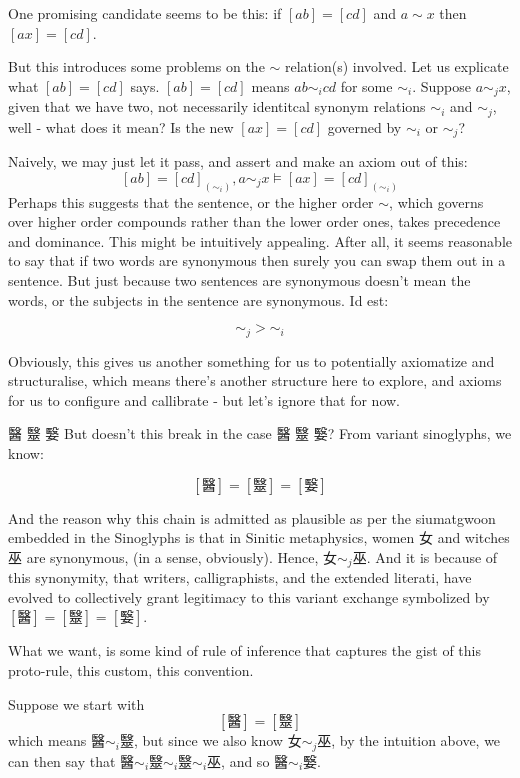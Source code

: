 One promising candidate seems to be this: if $[ab]=[cd]$ and $a\sim x$ then $[ax] = [cd]$.

But this introduces some problems on the $\sim$ relation(s) involved. Let us explicate what $[ab] = [cd]$ says. $[ab] = [cd]$ means $ab \sim_i cd$ for some $\sim_i$. Suppose $a \sim_j x$, given that we have two, not necessarily identitcal synonym relations $\sim_i$ and $\sim_j$, well - what does it mean? Is the new $[ax]=[cd]$ governed by $\sim_i$ or $\sim_j$?

Naively, we may just let it pass, and assert and make an axiom out of this: 
$$ [ab] = [cd]_{(\sim_i)}, a\sim_j x \models [ax] = [cd] _{(\sim_i)} $$ 
Perhaps this suggests that the sentence, or the higher order $\sim$, which governs over higher order compounds rather than the lower order ones, takes precedence and dominance. This might be intuitively appealing. After all, it seems reasonable to say that if two words are synonymous then surely you can swap them out in a sentence. But just because two sentences are synonymous doesn't mean the words, or the subjects in the sentence are synonymous. Id est: 

$$\sim_j > \sim_i$$ 

Obviously, this gives us another something for us to potentially axiomatize and structuralise, which means there's another structure here to explore, and axioms for us to configure and callibrate - but let's ignore that for now. 








醫 毉 嫛
But doesn't this break in the case 醫 毉 嫛? From variant sinoglyphs, we know:

$$[\text{醫}]=[\text{毉}]=[\text{嫛}] $$

And the reason why this chain is admitted as plausible as per the siumatgwoon embedded in the Sinoglyphs is that in Sinitic metaphysics, women 女 and witches 巫 are synonymous, (in a sense, obviously). Hence, $\text{女}\sim_j\text{巫}$. And it is because of this synonymity, that writers, calligraphists, and the extended literati, have evolved to collectively grant legitimacy to this variant exchange symbolized by $[\text{醫}]=[\text{毉}]=[\text{嫛}]$.

What we want, is some kind of rule of inference that captures the gist of this proto-rule, this custom, this convention. 

Suppose we start with $$[\text{醫}]=[\text{毉}]$$
which means $\text{醫}\sim_i\text{毉}$, but since we also know $\text{女}\sim_j\text{巫}$, by the intuition above, we can then say that $\text{醫}\sim_i\text{毉} \sim_i \text{毉}\sim_i\text{巫}$, and so $\text{醫}\sim_i\text{嫛}$.

